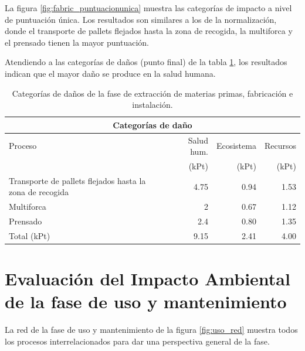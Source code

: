 La figura \ref{fig:fabric_puntuacionunica} muestra las categorías de impacto a nivel de puntuación única. Los resultados son similares a los de la normalización, donde el transporte de pallets flejados hasta la zona de recogida, la multiforca y el prensado tienen la mayor puntuación.

Atendiendo a las categorías de daños (punto final) de la tabla \ref{categoriasdanosfabricacion}, los resultados indican que el mayor daño se produce en la salud humana.

\begin{table}[!htb]
\centering
\begin{tabular}{p{6cm}rrr}
\toprule
\multicolumn{4}{c}{Categorías de daño}\\
\midrule
Proceso & Salud hum. & Ecosistema & Recursos\\
 & (kPt) & (kPt) &  (kPt)\\
\midrule
Transporte de pallets flejados hasta la zona de recogida & 4.75 & 0.94 & 1.53\\
Multiforca & 2 & 0.67 & 1.12\\
Prensado & 2.4 & 0.80 & 1.35\\
\midrule
Total (kPt) & 9.15 & 2.41 & 4.00\\
\bottomrule
\end{tabular}
\caption{Categorías de daños de la fase de extracción de materias primas, fabricación e instalación.}
\label{categoriasdanosfabricacion}
\end{table}

\section{Evaluación del Impacto Ambiental de la fase de uso y mantenimiento}

La red de la fase de uso y mantenimiento de la figura \ref{fig:uso_red} muestra todos los procesos interrelacionados para dar una perspectiva general de la fase.

